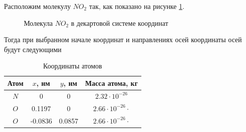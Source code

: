 Расположим молекулу $NO_2$ так, как показано на рисунке \ref{fig:geogebra-export}. 
\begin{figure}
	\centering
	\caption{Молекула $NO_2$ в декартовой системе координат}
	\label{fig:geogebra-export}
\end{figure}

Тогда при выбранном начале координат и направлениях осей координаты осей будут следующими
\begin{table}[h!]
	\centering
	\caption{Координаты атомов}
	\label{tab3}
	\setlength{\extrarowheight}{1mm}
	\begin{tabular}{|c|c|c|c|}
		\hline 
		Атом & $x$, нм & $y$, нм & Масса атома, кг \\ 
		\hline 
		$N$ & 0 & 0 & $2.32\cdot10^{-26}$ \\ 
		\hline 
		$O$ & 0.1197 & 0 & $2.66\cdot10^{-26}\cdot$ \\ 
		\hline 
		$O$ & -0.0836 & 0.0857 & $2.66\cdot10^{-26}\cdot$ \\ 
		\hline 
	\end{tabular} 
\end{table}

